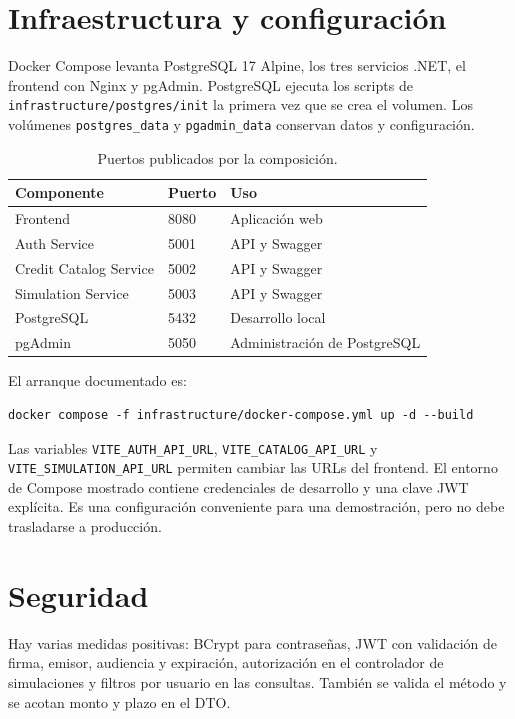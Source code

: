 \documentclass[12pt,a4paper]{article}
\begin{document}
\section{Infraestructura y configuración}

Docker Compose levanta PostgreSQL 17 Alpine, los tres servicios .NET, el
frontend con Nginx y pgAdmin. PostgreSQL ejecuta los scripts de
\texttt{infrastructure/postgres/init} la primera vez que se crea el volumen.
Los volúmenes \texttt{postgres\_data} y \texttt{pgadmin\_data} conservan
datos y configuración.

\begin{table}[H]
\centering
\caption{Puertos publicados por la composición.}
\label{tab:puertos}
\begin{tabular}{lll}
\hline
\textbf{Componente} & \textbf{Puerto} & \textbf{Uso}\\
\hline
Frontend & 8080 & Aplicación web\\
Auth Service & 5001 & API y Swagger\\
Credit Catalog Service & 5002 & API y Swagger\\
Simulation Service & 5003 & API y Swagger\\
PostgreSQL & 5432 & Desarrollo local\\
pgAdmin & 5050 & Administración de PostgreSQL\\
\hline
\end{tabular}
\end{table}

El arranque documentado es:
\begin{verbatim}
docker compose -f infrastructure/docker-compose.yml up -d --build
\end{verbatim}
Las variables \texttt{VITE\_AUTH\_API\_URL},
\texttt{VITE\_CATALOG\_API\_URL} y
\texttt{VITE\_SIMULATION\_API\_URL} permiten cambiar las URLs del frontend.
El entorno de Compose mostrado contiene credenciales de desarrollo y una
clave JWT explícita. Es una configuración conveniente para una demostración,
pero no debe trasladarse a producción.

\section{Seguridad}

Hay varias medidas positivas: BCrypt para contraseñas, JWT con validación de
firma, emisor, audiencia y expiración, autorización en el controlador de
simulaciones y filtros por usuario en las consultas. También se valida el
método y se acotan monto y plazo en el DTO.
\end{document}
